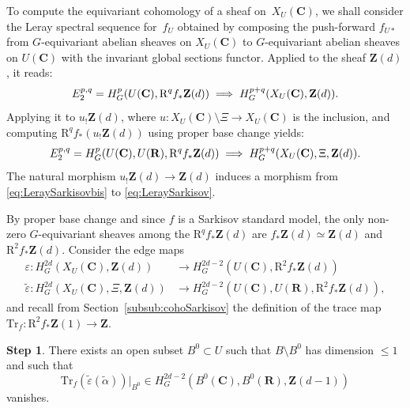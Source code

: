 \documentclass[JEP,XML,SOM,Unicode]{cedram}
\newcommand\implique{\mathchoice{\implies}{\Rightarrow}{\Rightarrow}{\Rightarrow}}
\theoremstyle{plain}
\theoremstyle{definition}
\newtheorem{Step}{Step}
\numberwithin{equation}{section}
\renewcommand{\C}{{\mathbf C}}
\newcommand{\R}{{\mathbf R}}
\newcommand{\Z}{{\mathbf Z}}
\newcommand{\Trf}{\mathrm{Tr}_f}
\newcommand{\RR}{{\mathrm{R}}}
\begin{document}
To compute the equivariant cohomology of a sheaf on~$X_U(\C)$, we shall consider the Leray spectral sequence for~$f_U$ obtained by composing the push-forward $f_{U*}$ from $G$-equivariant abelian sheaves on $X_U(\C)$ to $G$-equivariant abelian sheaves on $U(\C)$
with the invariant global sections functor. Applied to the sheaf $\Z(d)$, it reads:
\begin{equation}
\label{eq:LeraySarkisov}
E_2^{p,q}=H^p_G(U(\C),\RR^qf_{*}\Z(d))\implique H_G^{p+q}(X_U(\C),\Z(d)).
\end{equation}
Applying it to $u_!\Z(d)$, where $u:X_U(\C)\setminus\Xi\to X_U(\C)$ is the inclusion, and computing $\RR^qf_*(u_!\Z(d))$ using proper base change yields:
\begin{equation}
\label{eq:LeraySarkisovbis}
E_2^{p,q}=H^p_G(U(\C),U(\R),\RR^qf_{*}\Z(d))\implique H_G^{p+q}(X_U(\C),\Xi,\Z(d)).
\end{equation}
The natural morphism $u_!\Z(d)\to\Z(d)$ induces a morphism from \eqref{eq:LeraySarkisovbis} to \eqref{eq:LeraySarkisov}.

By proper base change and since $f$ is a Sarkisov standard model, the only non-zero $G$-equivariant sheaves among the $\RR^qf_{*}\Z(d)$ are $f_{*}\Z(d)\simeq\Z(d)$ and $\RR^2f_{*}\Z(d)$. Consider the edge maps
\begin{align*}
\varepsilon:H^{2d}_G(X_U(\C),\Z(d))&\to H^{2d-2}_G(U(\C),\RR^2f_{*}\Z(d))\\
\tag*{and}
\tilde{\varepsilon}:H^{2d}_G(X_U(\C),\Xi,\Z(d))&\to H^{2d-2}_G(U(\C),U(\R),\RR^2f_{*}\Z(d)),
\end{align*}
and recall from Section~\ref{subsub:cohoSarkisov} the definition of the trace map $\Trf: \RR^2f_{*}\Z(1)\to\Z$.

\begin{Step}
\label{step:notrace}
There exists an open subset $B^0\subset U$ such that $B\setminus B^0$ has dimension $\leq 1$ and such that
\[
\Trf(\tilde{\varepsilon}(\tilde{\alpha}))|_{B^0}\in H^{2d-2}_G(B^0(\C),B^0(\R),\Z(d-1))
\]
vanishes.
\end{Step}
\end{document}

